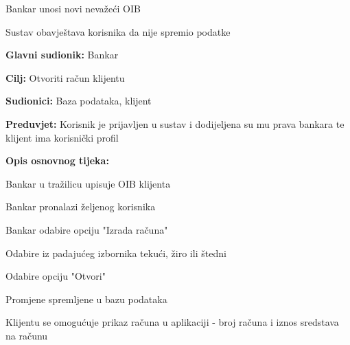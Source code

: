 \begin{packed_item}
\begin{packed_item}
\begin{packed_enum}
                  		
                  	\end{packed_enum}
                
                    \item[3.a] Bankar unosi novi nevažeći OIB
                    \item[] \begin{packed_enum}
                      
                      \item Sustav obavještava korisnika da nije spremio podatke
                      
                    \end{packed_enum}
                  
                \end{packed_item}
            \end{packed_item}
        
        
                
               \noindent {}
                \begin{packed_item}
            
                  \item \textbf{Glavni sudionik: }Bankar
                  \item  \textbf{Cilj:} Otvoriti račun klijentu
                  \item  \textbf{Sudionici:} Baza podataka, klijent
                  \item  \textbf{Preduvjet:} Korisnik je prijavljen u sustav i dodijeljena su mu prava bankara te klijent ima korisnički profil
                  \item  \textbf{Opis osnovnog tijeka:}
                  
                  \item[] \begin{packed_enum}
                
                	\item Bankar u tražilicu upisuje OIB klijenta
                	\item Bankar pronalazi željenog korisnika
                    \item Bankar odabire opciju "Izrada računa" 
                    \item Odabire iz padajućeg izbornika tekući, žiro ili štedni
                    \item Odabire opciju "Otvori"
                    \item Promjene spremljene u bazu podataka                 
                    \item Klijentu se omogućuje prikaz računa u aplikaciji - broj računa i iznos sredstava na računu
                   \end{packed_enum}
                  
                \end{packed_item}
                

